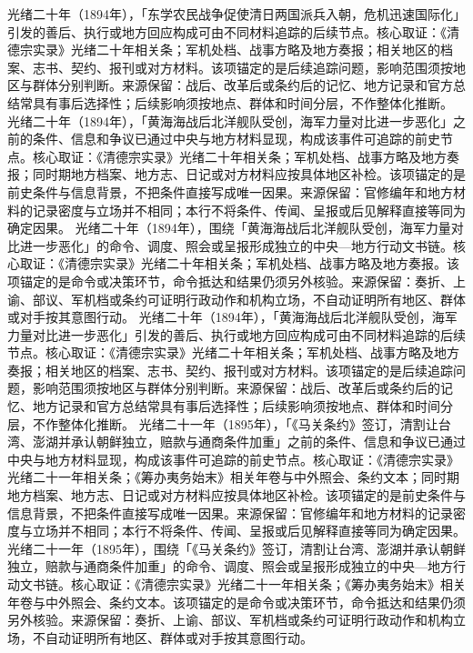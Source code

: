 光绪二十年（1894年），「东学农民战争促使清日两国派兵入朝，危机迅速国际化」引发的善后、执行或地方回应构成可由不同材料追踪的后续节点。核心取证：《清德宗实录》光绪二十年相关条；军机处档、战事方略及地方奏报；相关地区的档案、志书、契约、报刊或对方材料。该项锚定的是后续追踪问题，影响范围须按地区与群体分别判断。来源保留：战后、改革后或条约后的记忆、地方记录和官方总结常具有事后选择性；后续影响须按地点、群体和时间分层，不作整体化推断。
光绪二十年（1894年），「黄海海战后北洋舰队受创，海军力量对比进一步恶化」之前的条件、信息和争议已通过中央与地方材料显现，构成该事件可追踪的前史节点。核心取证：《清德宗实录》光绪二十年相关条；军机处档、战事方略及地方奏报；同时期地方档案、地方志、日记或对方材料应按具体地区补检。该项锚定的是前史条件与信息背景，不把条件直接写成唯一因果。来源保留：官修编年和地方材料的记录密度与立场并不相同；本行不将条件、传闻、呈报或后见解释直接等同为确定因果。
光绪二十年（1894年），围绕「黄海海战后北洋舰队受创，海军力量对比进一步恶化」的命令、调度、照会或呈报形成独立的中央—地方行动文书链。核心取证：《清德宗实录》光绪二十年相关条；军机处档、战事方略及地方奏报。该项锚定的是命令或决策环节，命令抵达和结果仍须另外核验。来源保留：奏折、上谕、部议、军机档或条约可证明行政动作和机构立场，不自动证明所有地区、群体或对手按其意图行动。
光绪二十年（1894年），「黄海海战后北洋舰队受创，海军力量对比进一步恶化」引发的善后、执行或地方回应构成可由不同材料追踪的后续节点。核心取证：《清德宗实录》光绪二十年相关条；军机处档、战事方略及地方奏报；相关地区的档案、志书、契约、报刊或对方材料。该项锚定的是后续追踪问题，影响范围须按地区与群体分别判断。来源保留：战后、改革后或条约后的记忆、地方记录和官方总结常具有事后选择性；后续影响须按地点、群体和时间分层，不作整体化推断。
光绪二十一年（1895年），「《马关条约》签订，清割让台湾、澎湖并承认朝鲜独立，赔款与通商条件加重」之前的条件、信息和争议已通过中央与地方材料显现，构成该事件可追踪的前史节点。核心取证：《清德宗实录》光绪二十一年相关条；《筹办夷务始末》相关年卷与中外照会、条约文本；同时期地方档案、地方志、日记或对方材料应按具体地区补检。该项锚定的是前史条件与信息背景，不把条件直接写成唯一因果。来源保留：官修编年和地方材料的记录密度与立场并不相同；本行不将条件、传闻、呈报或后见解释直接等同为确定因果。
光绪二十一年（1895年），围绕「《马关条约》签订，清割让台湾、澎湖并承认朝鲜独立，赔款与通商条件加重」的命令、调度、照会或呈报形成独立的中央—地方行动文书链。核心取证：《清德宗实录》光绪二十一年相关条；《筹办夷务始末》相关年卷与中外照会、条约文本。该项锚定的是命令或决策环节，命令抵达和结果仍须另外核验。来源保留：奏折、上谕、部议、军机档或条约可证明行政动作和机构立场，不自动证明所有地区、群体或对手按其意图行动。
